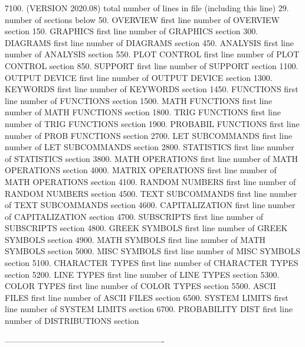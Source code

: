 7100.       (VERSION 2020.08)  total number of lines in file (including this line)
29.                          number of     sections below
   50.    OVERVIEW           first line number of OVERVIEW          section
  150.    GRAPHICS           first line number of GRAPHICS          section
  300.    DIAGRAMS           first line number of DIAGRAMS          section
  450.    ANALYSIS           first line number of ANALYSIS          section
  550.    PLOT CONTROL       first line number of PLOT CONTROL      section
  850.    SUPPORT            first line number of SUPPORT           section
 1100.    OUTPUT DEVICE      first line number of OUTPUT DEVICE     section
 1300.    KEYWORDS           first line number of KEYWORDS          section
 1450.    FUNCTIONS          first line number of FUNCTIONS         section
 1500.    MATH FUNCTIONS     first line number of MATH FUNCTIONS    section
 1800.    TRIG FUNCTIONS     first line number of TRIG FUNCTIONS    section
 1900.    PROBABIL FUNCTIONS first line number of PROB FUNCTIONS    section
 2700.    LET SUBCOMMANDS    first line number of LET SUBCOMMANDS   section
 2800.    STATISTICS         first line number of STATISTICS        section
 3800.    MATH OPERATIONS    first line number of MATH OPERATIONS   section
 4000.    MATRIX OPERATIONS  first line number of MATH OPERATIONS   section
 4100.    RANDOM NUMBERS     first line number of RANDOM NUMBERS    section
 4500.    TEXT SUBCOMMANDS   first line number of TEXT SUBCOMMANDS  section
 4600.    CAPITALIZATION     first line number of CAPITALIZATION    section
 4700.    SUBSCRIPTS         first line number of SUBSCRIPTS        section
 4800.    GREEK SYMBOLS      first line number of GREEK SYMBOLS     section
 4900.    MATH SYMBOLS       first line number of MATH SYMBOLS      section
 5000.    MISC SYMBOLS       first line number of MISC SYMBOLS      section
 5100.    CHARACTER TYPES    first line number of CHARACTER TYPES   section
 5200.    LINE TYPES         first line number of LINE TYPES        section
 5300.    COLOR TYPES        first line number of COLOR TYPES       section
 5500.    ASCII FILES        first line number of ASCII FILES       section
 6500.    SYSTEM LIMITS      first line number of SYSTEM LIMITS     section
 6700.    PROBABILITY DIST   first line number of DISTRIBUTIONS     section
 
----------------------------------------------------------
















